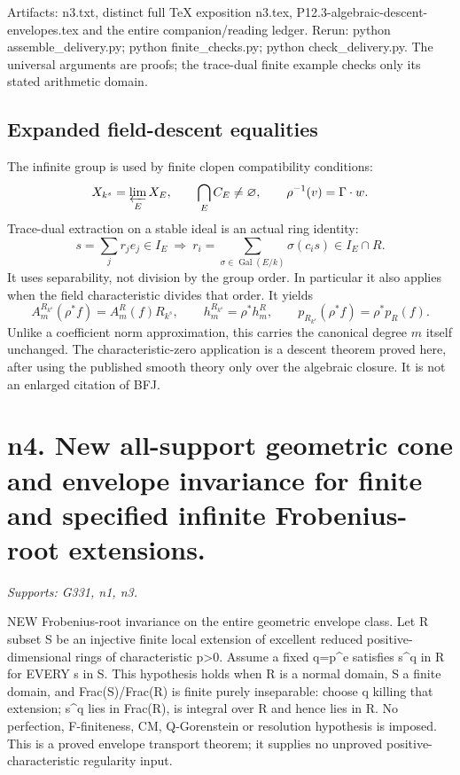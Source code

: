\documentclass[11pt]{article}
\begin{document}
Artifacts: n3.txt, distinct full TeX exposition n3.tex, P12.3-algebraic-descent-envelopes.tex and the entire companion/reading ledger. Rerun: python assemble\_delivery.py; python finite\_checks.py; python check\_delivery.py. The universal arguments are proofs; the trace-dual finite example checks only its stated arithmetic domain.

\subsection*{Expanded field-descent equalities}
The infinite group is used by finite clopen compatibility conditions:
\[
 X_{k^s}=\varprojlim_E X_E,\qquad
 \bigcap_E C_E\ne\varnothing,\qquad
 \rho^{-1}(v)=\Gamma\cdot w.
\]
Trace-dual extraction on a stable ideal is an actual ring identity:
\[
 s=\sum_jr_je_j\in I_E\ \Longrightarrow\
 r_i=\sum_{\sigma\in\operatorname{Gal}(E/k)}\sigma(c_is)
 \in I_E\cap R.
\]
It uses separability, not division by the group order. In particular it
also applies when the field characteristic divides that order. It yields
\[
 A_m^{R_{k^s}}(\rho^*f)=A_m^R(f)R_{k^s},\qquad
 h_m^{R_{k^s}}=\rho^*h_m^R,\qquad
 p_{R_{k^s}}(\rho^*f)=\rho^*p_R(f).
\]
Unlike a coefficient norm approximation, this carries the canonical
degree $m$ itself unchanged. The characteristic-zero application is a
descent theorem proved here, after using the published smooth theory
only over the algebraic closure. It is not an enlarged citation of BFJ.


\section{n4. New all-support geometric cone and envelope invariance for finite and specified infinite Frobenius-root extensions.}
\textit{Supports: G331, n1, n3.}

NEW Frobenius-root invariance on the entire geometric envelope class. Let R subset S be an injective finite local extension of excellent reduced positive-dimensional rings of characteristic p\textgreater{}0. Assume a fixed q=p\textasciicircum{}e satisfies s\textasciicircum{}q in R for EVERY s in S. This hypothesis holds when R is a normal domain, S a finite domain, and Frac(S)/Frac(R) is finite purely inseparable: choose q killing that extension; s\textasciicircum{}q lies in Frac(R), is integral over R and hence lies in R. No perfection, F-finiteness, CM, Q-Gorenstein or resolution hypothesis is imposed. This is a proved envelope transport theorem; it supplies no unproved positive-characteristic regularity input.
\end{document}
